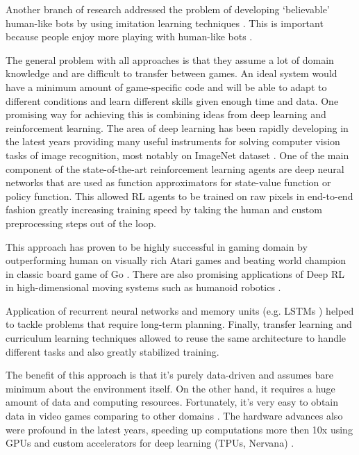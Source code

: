 Another branch of research addressed the problem of developing `believable' human-like bots \cite{BelievableBots} by using imitation learning techniques \cite{UT2}. This is important because people enjoy more playing with human-like bots \cite{ToBeDone}.


The general problem with all approaches is that they assume a lot of domain knowledge and are difficult to transfer between games. An ideal system would have a minimum amount of game-specific code and will be able to adapt to different conditions and learn different skills given enough time and data.
One promising way for achieving this is combining ideas from deep learning and reinforcement learning.
The area of deep learning has been rapidly developing in the latest years providing many useful
instruments for solving computer vision tasks of image recognition, most notably on ImageNet dataset \cite{AlexNet}. 
One of the main component of the state-of-the-art reinforcement learning agents are deep neural networks that are used as function approximators for state-value function or policy function.
This allowed RL agents to be trained on raw pixels in end-to-end fashion greatly increasing training speed by taking the human and custom preprocessing steps out of the loop.

This approach has proven to be highly successful in gaming domain by outperforming human on visually rich Atari games \cite{Atari} and beating world champion in classic board game of Go \cite{AlphaGo}.
There are also promising applications of Deep RL in high-dimensional moving systems such as humanoid robotics \cite{Robotics}.

Application of recurrent neural networks\cite{RLRNN} and memory units (e.g. LSTMs \cite{TextGamesLSTM}) helped to tackle problems that require long-term planning.
Finally, transfer learning \cite{ToBeDone} and curriculum learning \cite{Curriculum} techniques allowed to reuse the same architecture to handle different tasks and also greatly stabilized training.

The benefit of this approach is that it's purely data-driven and assumes bare minimum about the environment itself. On the other hand, it requires a huge amount of data and computing resources.
Fortunately, it's very easy to obtain data in video games comparing to other domains \cite{TrainInGames}. The hardware advances also were profound in the latest years, speeding up computations more then 10x using GPUs and custom accelerators for deep learning (TPUs, Nervana) \cite{ToBeDone}.

